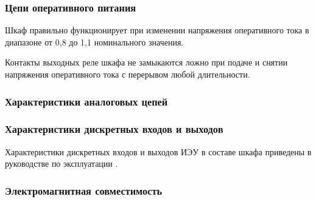 \subsubsection{Цепи оперативного питания}

\begin{enumsubsub}
\item {}
\item Шкаф правильно функционирует при изменении напряжения оперативного тока в диапазоне от 0,8 до 1,1 номинального значения.
\item Контакты выходных реле шкафа не замыкаются ложно при подаче и снятии напряжения оперативного тока с перерывом любой длительности.
\end{enumsubsub}

\subsubsection{Характеристики аналоговых цепей}
\begin{enumsubsub}
\item {}
\end{enumsubsub}

\subsubsection{Характеристики дискретных входов и выходов}
\begin{enumsubsub}
\item Характеристики дискретных входов и выходов ИЭУ в составе шкафа приведены в руководстве по эксплуатации \ManualUnitGeneral.
\end{enumsubsub}

\subsubsection{Электромагнитная совместимость}
\begin{enumsubsub}
\item {}
\end{enumsubsub}


